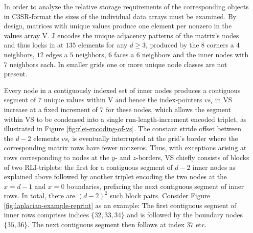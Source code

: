     \begin{center}
    \end{center}

    In order to analyze the relative storage requirements of the corresponding objects in C3SR-format the sizes of the
    individual data arrays must be examined. By design, matrices with unique values produce one element per nonzero in
    the values array V. J encodes the unique adjacency patterns of the matrix's nodes and thus locks in at $135$ elements for
    any $d \geq 3$, produced by the $8$ corners a $4$ neighbors, $12$ edges a $5$ neighbors, $6$ faces a $6$ neighbors
    and the inner nodes with $7$ neighbors each. In smaller grids one or more unique node classes are not present.

    Every node in a contiguously indexed set of inner nodes produces a contiguous segment of $7$ unique values within V
    and hence the index-pointers $vs_i$ in VS increase at a fixed increment of $7$ for these nodes, which allows the
    segment within VS to be condensed into a single run-length-increment encoded triplet, as illustrated in Figure
    \ref{fig:rlei-encoding-of-vs}. The constant stride offset between the $d-2$ elements $vs_i$ is eventually
    interrupted at the grid's border where the corresponding matrix rows have fewer nonzeros. Thus, with exceptions
    arising at rows corresponding to nodes at the $y$- and $z$-borders, VS chiefly consists of blocks of two
    RLI-triplets: the first for a contiguous segment of $d-2$ inner nodes as explained above followed by another triplet
    encoding the two nodes at the $x=d-1$ and $x=0$ boundaries, prefacing the next contiguous segment of inner rows. In
    total, there are $(d-2)^2$ such block pairs. Consider Figure \ref{fig:laplacian-example-reprint} as an example: The
    first contiguous segment of inner rows comprises indices $\{32, 33, 34\}$ and is followed by the boundary nodes
    $\{35, 36\}$. The next contiguous segment then follows at index $37$ etc.


